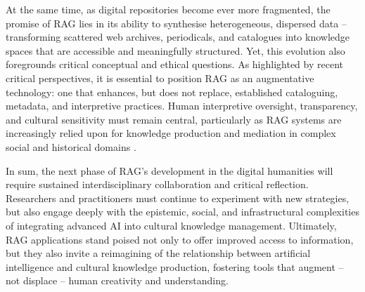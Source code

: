 \begin{spacing}{1.5}
At the same time, as digital repositories become ever more fragmented, the promise of RAG lies in its ability to synthesise heterogeneous, dispersed data -- transforming scattered web archives, periodicals, and catalogues into knowledge spaces that are accessible and meaningfully structured. Yet, this evolution also foregrounds critical conceptual and ethical questions. As highlighted by recent critical perspectives, it is essential to position RAG as an augmentative technology: one that enhances, but does not replace, established cataloguing, metadata, and interpretive practices. Human interpretive oversight, transparency, and cultural sensitivity must remain central, particularly as RAG systems are increasingly relied upon for knowledge production and mediation in complex social and historical domains \citep{di_marcantonio_intelligenza_2024}.

In sum, the next phase of RAG’s development in the digital humanities will require sustained interdisciplinary collaboration and critical reflection. Researchers and practitioners must continue to experiment with new strategies, but also engage deeply with the epistemic, social, and infrastructural complexities of integrating advanced AI into cultural knowledge management. Ultimately, RAG applications stand poised not only to offer improved access to information, but they also invite a reimagining of the relationship between artificial intelligence and cultural knowledge production, fostering tools that augment -- not displace -- human creativity and understanding.
\end{spacing}